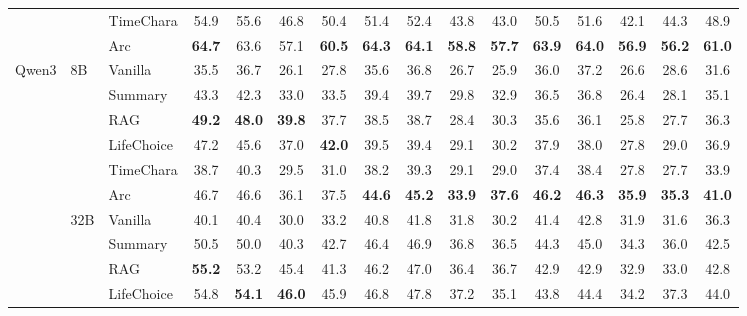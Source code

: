 \documentclass{llmxive}
\begin{document}
\begin{table}[t]
\begin{tabular}{lllccccccccccccc}
 &  & TimeChara & 54.9 & 55.6 & 46.8 & 50.4 & 51.4 & 52.4 & 43.8 & 43.0 & 50.5 & 51.6 & 42.1 & 44.3 & 48.9 \\
 &  & \cellcolor{yellow!15} Arc & \cellcolor{yellow!15} \textbf{64.7} & \cellcolor{yellow!15} 63.6 & \cellcolor{yellow!15} 57.1 & \cellcolor{yellow!15} \textbf{60.5} & \cellcolor{yellow!15} \textbf{64.3} & \cellcolor{yellow!15} \textbf{64.1} & \cellcolor{yellow!15} \textbf{58.8} & \cellcolor{yellow!15} \textbf{57.7} & \cellcolor{yellow!15} \textbf{63.9} & \cellcolor{yellow!15} \textbf{64.0} & \cellcolor{yellow!15} \textbf{56.9} & \cellcolor{yellow!15} \textbf{56.2} & \cellcolor{yellow!15} \textbf{61.0} \\
\midrule
\multirow[t]{12}{*}{Qwen3} & \multirow[t]{6}{*}{8B} & Vanilla & 35.5 & 36.7 & 26.1 & 27.8 & 35.6 & 36.8 & 26.7 & 25.9 & 36.0 & 37.2 & 26.6 & 28.6 & 31.6 \\
 &  & Summary & 43.3 & 42.3 & 33.0 & 33.5 & 39.4 & 39.7 & 29.8 & 32.9 & 36.5 & 36.8 & 26.4 & 28.1 & 35.1 \\
 &  & RAG & \textbf{49.2} & \textbf{48.0} & \textbf{39.8} & 37.7 & 38.5 & 38.7 & 28.4 & 30.3 & 35.6 & 36.1 & 25.8 & 27.7 & 36.3 \\
 &  & LifeChoice & 47.2 & 45.6 & 37.0 & \textbf{42.0} & 39.5 & 39.4 & 29.1 & 30.2 & 37.9 & 38.0 & 27.8 & 29.0 & 36.9 \\
 &  & TimeChara & 38.7 & 40.3 & 29.5 & 31.0 & 38.2 & 39.3 & 29.1 & 29.0 & 37.4 & 38.4 & 27.8 & 27.7 & 33.9 \\
 &  & \cellcolor{yellow!15} Arc & \cellcolor{yellow!15} 46.7 & \cellcolor{yellow!15} 46.6 & \cellcolor{yellow!15} 36.1 & \cellcolor{yellow!15} 37.5 & \cellcolor{yellow!15} \textbf{44.6} & \cellcolor{yellow!15} \textbf{45.2} & \cellcolor{yellow!15} \textbf{33.9} & \cellcolor{yellow!15} \textbf{37.6} & \cellcolor{yellow!15} \textbf{46.2} & \cellcolor{yellow!15} \textbf{46.3} & \cellcolor{yellow!15} \textbf{35.9} & \cellcolor{yellow!15} \textbf{35.3} & \cellcolor{yellow!15} \textbf{41.0} \\
\cmidrule(l){2-16}
 & \multirow[t]{6}{*}{32B} & Vanilla & 40.1 & 40.4 & 30.0 & 33.2 & 40.8 & 41.8 & 31.8 & 30.2 & 41.4 & 42.8 & 31.9 & 31.6 & 36.3 \\
 &  & Summary & 50.5 & 50.0 & 40.3 & 42.7 & 46.4 & 46.9 & 36.8 & 36.5 & 44.3 & 45.0 & 34.3 & 36.0 & 42.5 \\
 &  & RAG & \textbf{55.2} & 53.2 & 45.4 & 41.3 & 46.2 & 47.0 & 36.4 & 36.7 & 42.9 & 42.9 & 32.9 & 33.0 & 42.8 \\
 &  & LifeChoice & 54.8 & \textbf{54.1} & \textbf{46.0} & 45.9 & 46.8 & 47.8 & 37.2 & 35.1 & 43.8 & 44.4 & 34.2 & 37.3 & 44.0 \\

\end{tabular}
\end{table}
\end{document}
